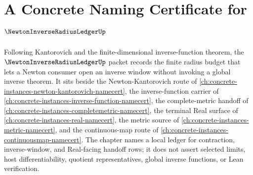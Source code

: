 \chapter{A Concrete Naming Certificate for $\NewtonInverseRadiusLedgerUp$}
\label{ch:concrete-instances-newton-inverse-radius-ledger-namecert}

Following Kantorovich and the finite-dimensional inverse-function theorem, the $\NewtonInverseRadiusLedgerUp$ packet records the finite radius budget that lets a Newton consumer open an inverse window without invoking a global inverse theorem. It sits beside the Newton-Kantorovich route of \autoref{ch:concrete-instances-newton-kantorovich-namecert}, the inverse-function carrier of \autoref{ch:concrete-instances-inverse-function-namecert}, the complete-metric handoff of \autoref{ch:concrete-instances-completemetric-namecert}, the terminal Real surface of \autoref{ch:concrete-instances-real-namecert}, the metric source of \autoref{ch:concrete-instances-metric-namecert}, and the continuous-map route of \autoref{ch:concrete-instances-continuousmap-namecert}. The chapter names a local ledger for contraction, inverse-window, and Real-facing handoff rows; it does not assert selected limits, host differentiability, quotient representatives, global inverse functions, or Lean verification.

